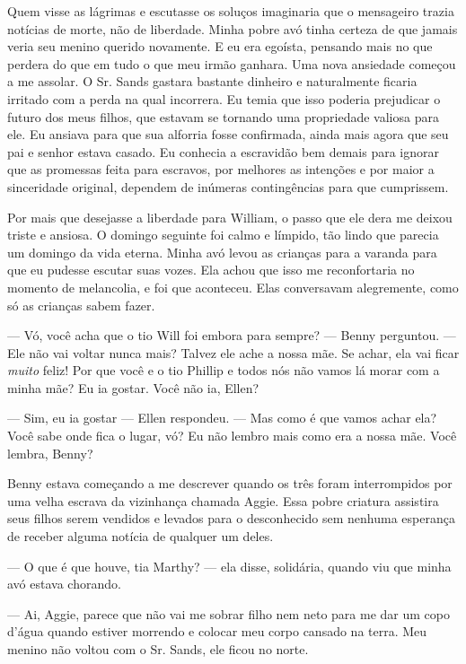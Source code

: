 Quem visse as lágrimas e escutasse os
soluços imaginaria que o mensageiro trazia notícias de morte, não de
liberdade. Minha pobre avó tinha certeza de que jamais veria seu menino
querido novamente. E eu era egoísta, pensando mais no que perdera do que
em tudo o que meu irmão ganhara. Uma nova ansiedade começou a me
assolar. O Sr. Sands gastara bastante dinheiro e naturalmente ficaria
irritado com a perda na qual incorrera. Eu temia que isso poderia
prejudicar o futuro dos meus filhos, que estavam se tornando uma
propriedade valiosa para ele. Eu ansiava para que sua alforria fosse
confirmada, ainda mais agora que seu pai e senhor estava casado. Eu
conhecia a escravidão bem demais para ignorar que as promessas feita
para escravos, por melhores as intenções e por maior a sinceridade
original, dependem de inúmeras contingências para que cumprissem.

Por mais que desejasse a liberdade para
William, o passo que ele dera me deixou triste e ansiosa. O domingo
seguinte foi calmo e límpido, tão lindo que parecia um domingo da vida
eterna. Minha avó levou as crianças para a varanda para que eu pudesse
escutar suas vozes. Ela achou que isso me reconfortaria no momento de
melancolia, e foi que aconteceu. Elas conversavam alegremente, como só
as crianças sabem fazer.

--- Vó, você acha que o tio Will foi embora para sempre? --- Benny
perguntou. --- Ele não vai voltar nunca mais? Talvez ele ache a nossa
mãe. Se achar, ela vai ficar \emph{muito} feliz! Por que você e o tio
Phillip e todos nós não vamos lá morar com a minha mãe? Eu ia gostar.
Você não ia, Ellen?

--- Sim, eu ia gostar --- Ellen
respondeu. --- Mas como é que vamos achar ela? Você sabe onde fica o
lugar, vó? Eu não lembro mais como era a nossa mãe. Você lembra, Benny?

Benny estava começando a me descrever
quando os três foram interrompidos por uma velha escrava da vizinhança
chamada Aggie. Essa pobre criatura assistira seus filhos serem vendidos
e levados para o desconhecido sem nenhuma esperança de receber alguma
notícia de qualquer um deles.

--- O que é que houve, tia Marthy? --- ela disse, solidária, quando viu
que minha avó estava chorando.

--- Ai, Aggie, parece que não vai me
sobrar filho nem neto para me dar um copo d'água quando estiver morrendo
e colocar meu corpo cansado na terra. Meu menino não voltou com o Sr.
Sands, ele ficou no norte.

